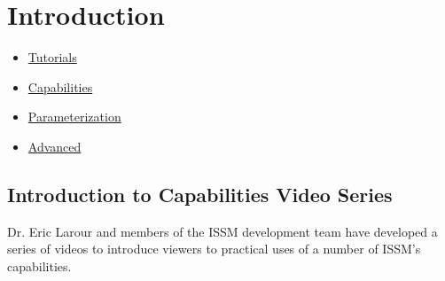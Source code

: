 
\section{Introduction} \label{sec:using-issm}

\begin{itemize}
	\item \hyperref[sec:using-issm-tutorials]{Tutorials}
	\item \hyperref[sec:using-issm-capabilities]{Capabilities}
	\item \hyperref[sec:using-issm-parameterization]{Parameterization}
	\item \hyperref[sec:using-issm-advanced]{Advanced}
\end{itemize}

\subsection{Introduction to Capabilities Video Series}
Dr. Eric Larour and members of the ISSM development team have developed a series of videos to introduce viewers to practical uses of a number of ISSM's capabilities.

